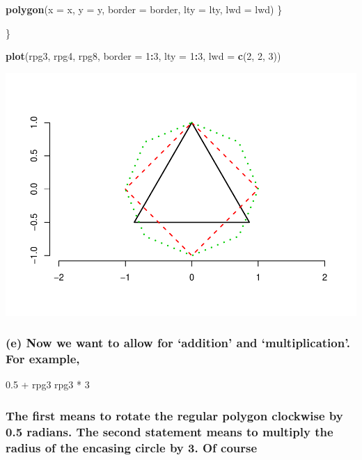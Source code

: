\documentclass[]{article}
\newenvironment{Shaded}{\begin{snugshade}}{\end{snugshade}}
\newcommand{\KeywordTok}[1]{\textcolor[rgb]{0.13,0.29,0.53}{\textbf{#1}}}
\newcommand{\DataTypeTok}[1]{\textcolor[rgb]{0.13,0.29,0.53}{#1}}
\newcommand{\DecValTok}[1]{\textcolor[rgb]{0.00,0.00,0.81}{#1}}
\newcommand{\OperatorTok}[1]{\textcolor[rgb]{0.81,0.36,0.00}{\textbf{#1}}}
\newcommand{\NormalTok}[1]{#1}
\begin{document}
\begin{Shaded}
\begin{Highlighting}[]
    \KeywordTok{polygon}\NormalTok{(}\DataTypeTok{x =}\NormalTok{ x, }\DataTypeTok{y =}\NormalTok{ y, }\DataTypeTok{border =}\NormalTok{ border, }\DataTypeTok{lty =}\NormalTok{ lty, }\DataTypeTok{lwd =}\NormalTok{ lwd)}
\NormalTok{  \}}
  
\NormalTok{\}}

\KeywordTok{plot}\NormalTok{(rpg3, rpg4, rpg8, }\DataTypeTok{border =} \DecValTok{1}\OperatorTok{:}\DecValTok{3}\NormalTok{, }\DataTypeTok{lty =} \DecValTok{1}\OperatorTok{:}\DecValTok{3}\NormalTok{, }\DataTypeTok{lwd =} \KeywordTok{c}\NormalTok{(}\DecValTok{2}\NormalTok{, }\DecValTok{2}\NormalTok{, }\DecValTok{3}\NormalTok{))}
\end{Highlighting}
\end{Shaded}

\includegraphics{Assigment4_files/figure-latex/unnamed-chunk-4-1.pdf}

\subsubsection{\texorpdfstring{(e) Now we want to allow for `addition'
and `multiplication'. For
example,}{(e) Now we want to allow for addition and multiplication. For example,}}\label{e-now-we-want-to-allow-for-addition-and-multiplication.-for-example}

0.5 + rpg3 rpg3 * 3

\subsubsection{The first means to rotate the regular polygon clockwise
by 0.5 radians. The second statement means to multiply the radius of the
encasing circle by 3. Of
course}\label{the-first-means-to-rotate-the-regular-polygon-clockwise-by-0.5-radians.-the-second-statement-means-to-multiply-the-radius-of-the-encasing-circle-by-3.-of-course}
\end{document}
